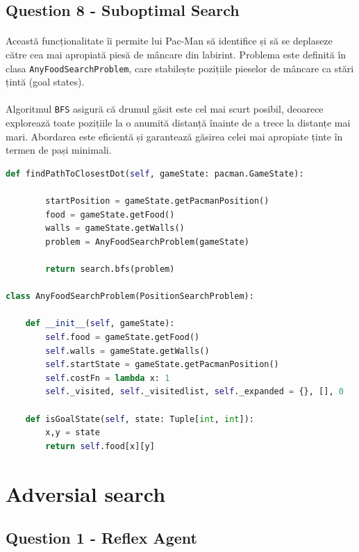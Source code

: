 \documentclass[12pt]{article}
\begin{document}
	\subsection{Question 8 - Suboptimal Search}
\paragraph{}Această funcționalitate îi permite lui Pac-Man să identifice și să se deplaseze către cea mai apropiată piesă de mâncare din labirint. Problema este definită în clasa \texttt{AnyFoodSearchProblem}, care stabilește pozițiile pieselor de mâncare ca stări țintă (goal states). \paragraph{}Algoritmul \texttt{BFS} asigură că drumul găsit este cel mai scurt posibil, deoarece explorează toate pozițiile la o anumită distanță înainte de a trece la distanțe mai mari. Abordarea este eficientă și garantează găsirea celei mai apropiate ținte în termen de pași minimali.

\begin{lstlisting}[language=Python]
    def findPathToClosestDot(self, gameState: pacman.GameState):
    
        startPosition = gameState.getPacmanPosition()
        food = gameState.getFood()
        walls = gameState.getWalls()
        problem = AnyFoodSearchProblem(gameState)
        
        return search.bfs(problem)

class AnyFoodSearchProblem(PositionSearchProblem):

    def __init__(self, gameState):
        self.food = gameState.getFood()
        self.walls = gameState.getWalls()
        self.startState = gameState.getPacmanPosition()
        self.costFn = lambda x: 1
        self._visited, self._visitedlist, self._expanded = {}, [], 0

    def isGoalState(self, state: Tuple[int, int]):
        x,y = state
        return self.food[x][y]
\end{lstlisting}
\section{Adversial search}

	\subsection{Question 1 - Reflex Agent}
\end{document}
